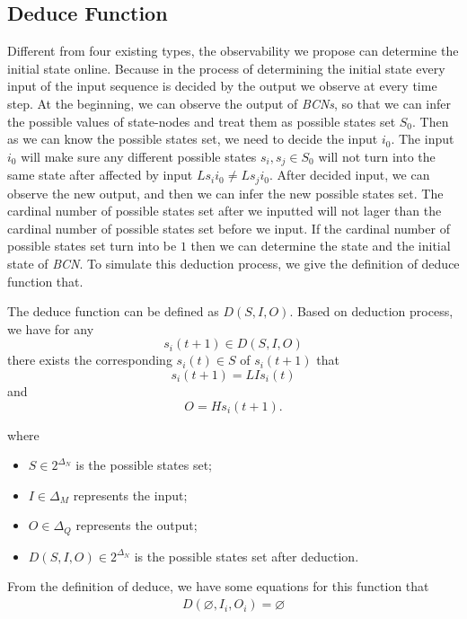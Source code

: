 \subsection{Deduce Function}
Different from four existing types, the observability we propose can determine the initial state online. Because in the process of determining the initial state every input of the input sequence is decided by the output we observe at every time step. At the beginning, we can observe the output of {\em BCNs}, so that we can infer the possible values of state-nodes and treat them as possible states set $S_0$. Then as we can know the possible states set, we need to decide the input $i_0$. The input $i_0$ will make sure any different possible states $s_i, s_j \in S_0$ will not turn into the same state after affected by input $Ls_i i_0\neq Ls_j i_0$. After decided input, we can observe the new output, and then we can infer the new possible states set. The cardinal number of possible states set after we inputted will not lager than the cardinal number of possible states set before we input. If the cardinal number of possible states set turn into be $1$ then we can determine the state and the initial state of {\em BCN}. To simulate this deduction process, we give the definition of deduce function that.
\begin{definition} The deduce function can be defined as $D\left(S, I, O\right)$. Based on deduction process, we have for any \[s_i(t+1)\in D\left(S, I, O\right)\] there exists the corresponding $s_i(t)\in S$ of $s_i(t+1)$ that \[s_i(t+1)=LIs_i(t)\] and \[O=Hs_i(t+1).\]
\end{definition}
where   
\begin{itemize}
  \item $S\in 2^{\Delta_N}$ is the possible states set;
  \item $I\in\Delta_M$ represents the input;
  \item $O\in\Delta_Q$ represents the output; 
  \item $D\left(S, I, O\right)\in 2^{\Delta_N}$ is the possible states set after deduction.
\end{itemize} 
 
 From the definition of deduce, we have some equations for this function that
\begin{equation}
\begin{split}
D\left(\varnothing,I_i,O_i\right)=\varnothing\\
\end{split}
\label{equ:7}
\end{equation}

